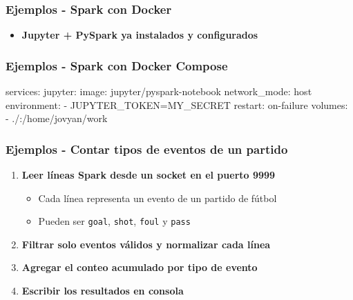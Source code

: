 \documentclass[aspectratio=169]{beamer}
\begin{document}
\begin{frame}[fragile]\frametitle{Ejemplos - Spark con Docker}
\begin{itemize}
	\item \textbf{Jupyter + PySpark ya instalados y configurados}
\end{itemize}

\vspace{2em}

\begin{shellbox}
\end{shellbox}
\end{frame}


\begin{frame}[fragile]\frametitle{Ejemplos - Spark con Docker Compose}
\begin{shcode}
    services:
      jupyter:
        image: jupyter/pyspark-notebook
        network_mode: host
        environment:
          - JUPYTER_TOKEN=MY_SECRET
        restart: on-failure
        volumes:
          - ./:/home/jovyan/work
\end{shcode}
\end{frame}


\begin{frame}[fragile]\frametitle{Ejemplos - Contar tipos de eventos de un partido}

\begin{enumerate}
  \item \textbf{Leer líneas Spark desde un socket en el puerto 9999}
  \begin{itemize}
	\item Cada línea representa un evento de un partido de fútbol
	\item Pueden ser \texttt{goal}, \texttt{shot}, \texttt{foul} y \texttt{pass}
  \end{itemize}

  \vspace{1em}

  \item \textbf{Filtrar solo eventos válidos y normalizar cada línea}

  \vspace{1em}

  \item \textbf{Agregar el conteo acumulado por tipo de evento}
  
  \vspace{1em}

  \item \textbf{Escribir los resultados en consola}
\end{enumerate}
\end{frame}
\end{document}
